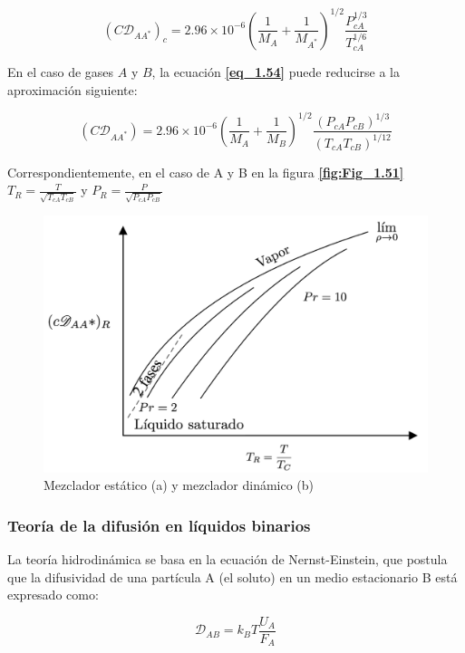 \begin{equation}
(C\mathscr{D}_{AA^*})_c = 2.96 \times 10^{-6} \left( \frac{1}{M_A} + \frac{1}{M_{A^*}} \right)^{1/2} \frac{P_{cA}^{1/3}}{T_{cA}^{1/6}}\tag{1.54}\label{eq_1.54}
\end{equation}

En el caso de gases \( A \) y \( B \), la ecuación \textbf{\eqref{eq_1.54}} puede reducirse a la aproximación siguiente:

\begin{equation}
(C \mathscr{D}_{AA^*}) = 2.96 \times 10^{-6} \left( \frac{1}{M_A} + \frac{1}{M_B} \right)^{1/2}  \frac{(P_{cA} P_{cB})^{1/3}}{(T_{cA} T_{cB})^{1/12}} \tag{1.55}\label{eq_1.55}
\end{equation}

Correspondientemente, en el caso de A y B en la figura \textbf{\eqref{fig:Fig_1.51}}
$T_R=\frac{T}{\sqrt{T_{cA}T_{cB}}}$ y $P_R=\frac{P}{\sqrt{P_{cA}P_{cB}}}$
\begin{figure}[H]
\centering
        \includegraphics[width=0.7
        \linewidth]{Capitulo1/Imagenes/Fig_1.51.jpeg}
        \caption{Mezclador estático (a) y mezclador dinámico (b)}
        \label{fig:Fig_1.51}

\end{figure}

\subsubsection{Teoría de la difusión en líquidos binarios}
La teoría hidrodinámica se basa en la ecuación de Nernst-Einstein, que postula que la difusividad de una partícula A (el soluto) en un medio estacionario B está expresado como:

\begin{equation}
\mathscr{D}_{AB} = k_B T \frac{U_A}{F_A}\tag{1.56}\label{eq_1.56}
\end{equation}

